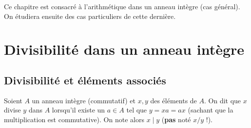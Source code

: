 \documentclass[12pt, a4paper]{report}
\begin{document}

\tableofcontents
\clearpage

\vspace*{\fill}
Ce chapitre est consacré à l'arithmétique dans un anneau intègre (cas général). On étudiera ensuite des cas particuliers de cette dernière.
\vspace*{\fill}

\chapter{Divisibilité dans un anneau intègre}

\section{Divisibilité et éléments associés}

\begin{definition}
    Soient $A$ un anneau intègre (commutatif) et $x,y$ des éléments de $A$. On dit que $x$ divise $y$ dans $A$ lorsqu'il existe un $a\in A$ tel que $y = xa = ax$ (sachant que la multiplication est commutative). On note alors $x\mid y$ (\textbf{pas} noté $x/y$ !).
\end{definition}
\end{document}
